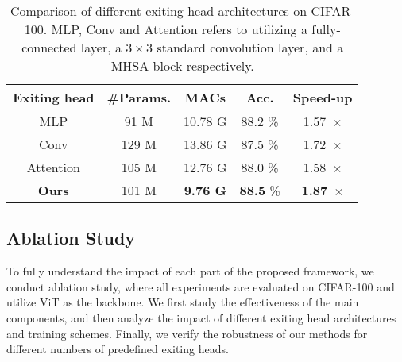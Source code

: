   \begin{table}
    \renewcommand\arraystretch{0.9}
    \centering
    \setlength{\extrarowheight}{0pt}
    \addtolength{\extrarowheight}{\aboverulesep}
    \addtolength{\extrarowheight}{\belowrulesep}
    \setlength{\aboverulesep}{0pt}
    \setlength{\belowrulesep}{0pt}
    \caption{Comparison of different exiting head architectures on CIFAR-100. 
    MLP, Conv and Attention refers to utilizing a fully-connected layer, a $3\times 3$ standard convolution layer, and a MHSA block respectively. }
    \label{tb:head}
    \vspace{-6pt}
    \begin{tabular}{ccccc} 
      \toprule
      \textbf{Exiting head}                           & \textbf{\#Params.} & \textbf{MACs} & \textbf{Acc.} & \textbf{Speed-up}  \\ 
      \hline
      MLP \cite{deebert}                                            & 91 M         & 10.78 G              &   88.2 \%               &  1.57~$\times$                    \\
      Conv \cite{ztw}                                           &   129 M         &  13.86 G             & 87.5 \%                  &  1.72~$\times$                  \\
      Attention \cite{ViT-EE}                                      & 105 M          & 12.76 G              &  88.0 \%                & 1.58~$\times$                     \\
      \rowcolor[rgb]{0.949,0.949,0.949} \textbf{Ours} &    101 M        & \textbf{9.76 G}              &  \textbf{88.5} \%            &  \textbf{1.87}~$\times$                    \\
      \bottomrule
      \end{tabular}
      \vspace{-6pt}
    \end{table}

\subsection{Ablation Study}
To fully understand the impact of each part of the proposed framework, we conduct ablation study, 
where all experiments are evaluated on CIFAR-100 and utilize ViT as the backbone. 
We first study the effectiveness of the main components, and then analyze the impact of different exiting head architectures and training schemes. 
Finally, we verify the robustness of our methods for different numbers of predefined exiting heads. 

